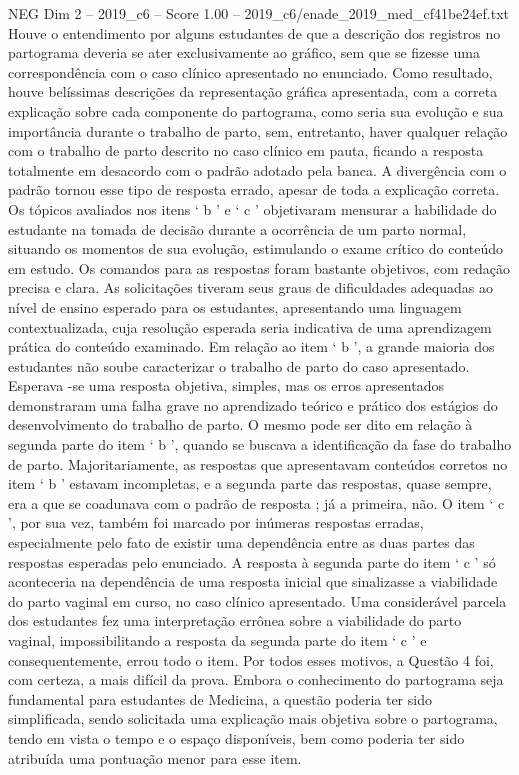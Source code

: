 \begin{textsample}{NEG Dim 2 – 2019\_c6 – Score 1.00 – 2019\_c6/enade\_2019\_med\_cf41be24ef.txt}
Houve o entendimento por alguns estudantes de que a descrição dos registros no partograma deveria se ater exclusivamente ao gráfico, sem que se fizesse uma correspondência com o caso clínico apresentado no enunciado.
Como resultado, houve belíssimas descrições da representação gráfica apresentada, com a correta explicação sobre cada componente do partograma, como seria sua evolução e sua importância durante o trabalho de parto, sem, entretanto, haver qualquer relação com o trabalho de parto descrito no caso clínico em pauta, ficando a resposta totalmente em desacordo com o padrão adotado pela banca.
A divergência com o padrão tornou esse tipo de resposta errado, apesar de toda a explicação correta.
Os tópicos avaliados nos itens ‘ b ’ e ‘ c ’ objetivaram mensurar a habilidade do estudante na tomada de decisão durante a ocorrência de um parto normal, situando os momentos de sua evolução, estimulando o exame crítico do conteúdo em estudo.
Os comandos para as respostas foram bastante objetivos, com redação precisa e clara.
As solicitações tiveram seus graus de dificuldades adequadas ao nível de ensino esperado para os estudantes, apresentando uma linguagem contextualizada, cuja resolução esperada seria indicativa de uma aprendizagem prática do conteúdo examinado.
Em relação ao item ‘ b ’, a grande maioria dos estudantes não soube caracterizar o trabalho de parto do caso apresentado.
Esperava -se uma resposta objetiva, simples, mas os erros apresentados demonstraram uma falha grave no aprendizado teórico e prático dos estágios do desenvolvimento do trabalho de parto.
O mesmo pode ser dito em relação à segunda parte do item ‘ b ’, quando se buscava a identificação da fase do trabalho de parto.
Majoritariamente, as respostas que apresentavam conteúdos corretos no item ‘ b ’ estavam incompletas, e a segunda parte das respostas, quase sempre, era a que se coadunava com o padrão de resposta ; já a primeira, não.
O item ‘ c ’, por sua vez, também foi marcado por inúmeras respostas erradas, especialmente pelo fato de existir uma dependência entre as duas partes das respostas esperadas pelo enunciado.
A resposta à segunda parte do item ‘ c ’ só aconteceria na dependência de uma resposta inicial que sinalizasse a viabilidade do parto vaginal em curso, no caso clínico apresentado.
Uma considerável parcela dos estudantes fez uma interpretação errônea sobre a viabilidade do parto vaginal, impossibilitando a resposta da segunda parte do item ‘ c ’ e consequentemente, errou todo o item.
Por todos esses motivos, a Questão 4 foi, com certeza, a mais difícil da prova.
Embora o conhecimento do partograma seja fundamental para estudantes de Medicina, a questão poderia ter sido simplificada, sendo solicitada uma explicação mais objetiva sobre o partograma, tendo em vista o tempo e o espaço disponíveis, bem como poderia ter sido atribuída uma pontuação menor para esse item.

\end{textsample}
